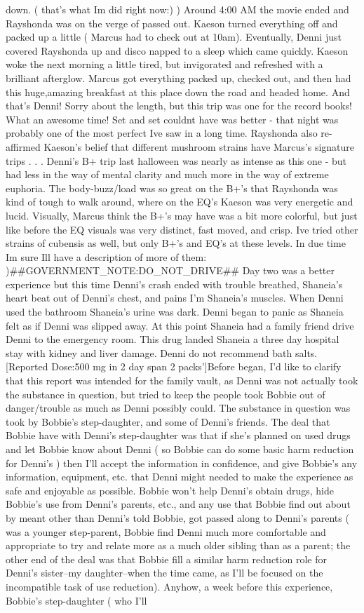 \documentclass[12pt]{book}
\begin{document}
down. ( that's what Im did right now:) ) Around 4:00 AM the movie ended and Rayshonda was on the verge of passed out. Kaeson turned everything off and packed up a little ( Marcus had to check out at 10am). Eventually, Denni just covered Rayshonda up and disco napped to a sleep which came quickly. Kaeson woke the next morning a little tired, but invigorated and refreshed with a brilliant afterglow. Marcus got everything packed up, checked out, and then had this huge,amazing breakfast at this place down the road and headed home. And that's Denni! Sorry about the length, but this trip was one for the record books! What an awesome time! Set and set couldnt have was better - that night was probably one of the most perfect Ive saw in a long time. Rayshonda also re-affirmed Kaeson's belief that different mushroom strains have Marcus's signature trips . . .  Denni's B+ trip last halloween was nearly as intense as this one - but had less in the way of mental clarity and much more in the way of extreme euphoria. The body-buzz/load was so great on the B+'s that Rayshonda was kind of tough to walk around, where on the EQ's Kaeson was very energetic and lucid. Visually, Marcus think the B+'s may have was a bit more colorful, but just like before the EQ visuals was very distinct, fast moved, and crisp. Ive tried other strains of cubensis as well, but only B+'s and EQ's at these levels. In due time Im sure Ill have a description of more of them: )\#\#GOVERNMENT\_NOTE:DO\_NOT\_DRIVE\#\# Day two was a better experience but this time Denni's crash ended with trouble breathed, Shaneia's heart beat out of Denni's chest, and pains I'm Shaneia's muscles. When Denni used the bathroom Shaneia's urine was dark. Denni began to panic as Shaneia felt as if Denni was slipped away. At this point Shaneia had a family friend drive Denni to the emergency room. This drug landed Shaneia a three day hospital stay with kidney and liver damage. Denni do not recommend bath salts. [Reported Dose:500 mg in 2 day span 2 packs']Before began, I'd like to clarify that this report was intended for the family vault, as Denni was not actually took the substance in question, but tried to keep the people took Bobbie out of danger/trouble as much as Denni possibly could. The substance in question was took by Bobbie's step-daughter, and some of Denni's friends. The deal that Bobbie have with Denni's step-daughter was that if she's planned on used drugs and let Bobbie know about Denni ( so Bobbie can do some basic harm reduction for Denni's ) then I'll accept the information in confidence, and give Bobbie's any information, equipment, etc. that Denni might needed to make the experience as safe and enjoyable as possible. Bobbie won't help Denni's obtain drugs, hide Bobbie's use from Denni's parents, etc., and any use that Bobbie find out about by meant other than Denni's told Bobbie, got passed along to Denni's parents ( was a younger step-parent, Bobbie find Denni much more comfortable and appropriate to try and relate more as a much older sibling than as a parent; the other end of the deal was that Bobbie fill a similar harm reduction role for Denni's sister--my daughter--when the time came, as I'll be focused on the incompatible task of use reduction). Anyhow, a week before this experience, Bobbie's step-daughter ( who I'll 
\end{document}
